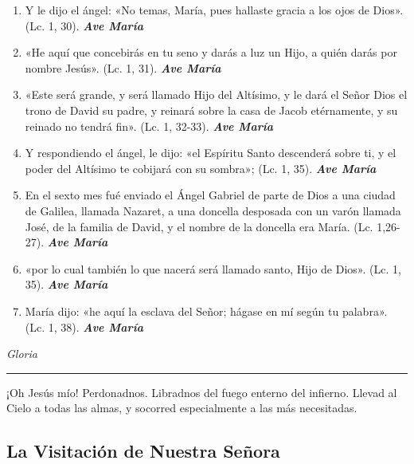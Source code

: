 \documentclass[a4paper,11pt, oneside]{report}
\begin{document}
{{\begin{enumerate}
      \item Y le dijo el ángel: «No temas, María, pues hallaste gracia a los ojos de Dios». (Lc. 1, 30). \textbf{\textit{Ave María}}

      \item «He aquí que concebirás en tu seno y darás a luz un Hijo, a quién darás por nombre Jesús». (Lc. 1, 31). \textbf{\textit{Ave María}}

      \item «Este será grande, y será llamado Hijo del Altísimo, y le dará el Señor Dios el trono de David su padre, 
      y reinará sobre la casa de Jacob etérnamente, y su reinado no tendrá fin». (Lc. 1, 32-33). \textbf{\textit{Ave María}}

      \item Y respondiendo el ángel, le dijo: «el Espíritu Santo descenderá sobre ti, 
      y el poder del Altísimo te cobijará con su sombra»; (Lc. 1, 35). \textbf{\textit{Ave María}}

      \item En el sexto mes fué enviado el Ángel Gabriel de parte de Dios a una ciudad de Galilea, llamada Nazaret, a una 
      doncella desposada con un varón llamada José, de la familia de David, y el nombre de la doncella era María. (Lc. 1,26- 27). \textbf{\textit{Ave María}}

      \item «por lo cual también lo que nacerá será llamado santo, Hijo de Dios». (Lc. 1, 35). \textbf{\textit{Ave María}}

      \item María dijo: «he aquí la esclava del Señor; hágase en mí según tu palabra». (Lc. 1, 38). \textbf{\textit{Ave María}}
    \end{enumerate}
      
    \indent\textit{Gloria}

    \begin{center}\rule{1\linewidth}{\linethickness}\end{center}

    \hypertarget{finalAnunciacion}{¡Oh Jesús mío! Perdonadnos. Libradnos del fuego enterno del infierno. Llevad al Cielo a todas las almas, y socorred especialmente a las más 
    necesitadas.}
  }

  \subsection*{La Visitación de Nuestra Señora}
  {
    
}}
\end{document}
